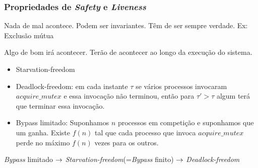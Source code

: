 \documentclass[aspectratio=169]{beamer}
\begin{document}
\begin{frame}
\frametitle{Propriedades de \emph{Safety} e \emph{Liveness}}  
\begin{description}[<+->]

  \item[\emph{Safety} (segurança)] Nada de mal acontece. Podem ser invariantes. Têm de ser sempre verdade. Ex: Exclusão mútua
  \item[\emph{Liveness} (vivacidade)] Algo de bom irá acontecer. Terão de acontecer ao longo da execução do sistema. 
\begin{itemize}
  \item \alert{Starvation-freedom} 
\item \alert{Deadlock-freedom}: em cada instante $\tau$ se vários processos invocaram $acquire\_mutex$ e essa invocação não terminou, então para $\tau'>\tau$ algum terá que terminar essa invocação.

\item \alert{Bypass limitado}: Suponhamos $n$ processos em competição e suponhamos que um  ganha. Existe $f(n)$ tal que cada processo que invoca $acquire\_mutex$ perde no máximo $f(n)$ vezes para os outros.
\end{itemize}
\centerline  \!\!\!\!\!\!\!\!\!\!\!\!\!\!\!\!\emph{Bypass} limitado $\to$ \emph{Starvation-freedom}(=\emph{Bypass} finito) $\to$ \emph{Deadlock-freedom}
\end{description}
\end{frame}
\end{document}
